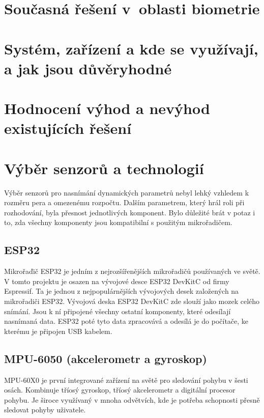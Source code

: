 \section{Současná řešení v~oblasti biometrie}

\section{Systém, zařízení a kde se využívají, a jak jsou důvěryhodné}

\section{Hodnocení výhod a nevýhod existujících řešení}

\section{Výběr senzorů a technologií}
Výběr senzorů pro nasnímání dynamických parametrů nebyl lehký vzhledem k rozměru pera a omezenému rozpočtu. %
Dalším parametrem, který hrál roli při rozhodování, byla přesnost jednotlivých komponent.                   %
Bylo důležité brát v potaz i to, zda všechny komponenty jsou kompatibilní s použitým mikrořadičem.          %

\subsection*{ESP32}
Mikrořaďič ESP32 je jedním z nejrozšířenějších mikrořadičů používaných ve světě.                            %
V tomto projektu je osazen na vývojové desce ESP32 DevKitC od firmy Espressif.                              %
Ta je jednou z nejpopulárnějších vývojových desek založených na mikrořadiči ESP32.                          %
Vývojová deska ESP32 DevKitC zde slouží jako mozek celého snímání.                                          %
Jsou k ní připojené všechny ostatní komponenty, které odesílají nasnímaná data.                             %
ESP32 poté tyto data zpracovává a odesílá je do počítače, ke kterému je připojen USB kabelem.               %

\subsection*{MPU-6050 (akcelerometr a gyroskop)}
MPU-60X0 je první integrované zařízení na světě pro sledování pohybu v šesti osách.                 %
Kombinuje tříosý gyroskop, tříosý akcelerometr a digitální procesor pohybu.                         %
Je široce využívaný v mnoha odvětvích, kde je potřeba schopnosti přesně sledovat pohyby uživatele.  %

